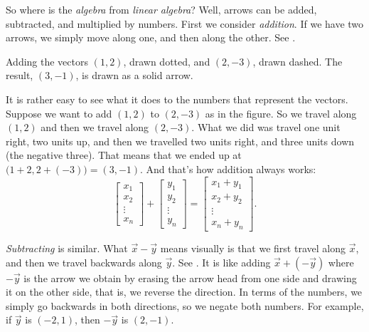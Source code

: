 So where is the \emph{algebra} from \emph{linear algebra}?
Well, arrows can be added, subtracted,
and multiplied by numbers.
First we consider \emph{addition}.
If we have two arrows, we simply
move along one, and then along the other.  See
.

\begin{myfig}
\capstart
{}
\caption{Adding the vectors $(1,2)$, drawn dotted, and $(2,-3)$, drawn dashed.  The
result, $(3,-1)$, is drawn as a solid arrow.\label{linalg-vecadd:fig}}
\end{myfig}

It is rather easy to see what it does to the numbers that represent the
vectors.  Suppose we want to add $(1,2)$ to $(2,-3)$ as in the figure.
So we travel along $(1,2)$
and then we travel along $(2,-3)$.
What we did was travel one unit right, two units up, and then
we travelled two units right, and three units down (the negative three).  That
means that we ended up at $\bigl(1+2,2+(-3)\bigr) = (3,-1)$.
And that's how addition always works:
\begin{equation*}
\begin{bmatrix}
x_{1} \\ x_2 \\ \vdots \\ x_n
\end{bmatrix} +
\begin{bmatrix}
y_{1} \\ y_2 \\ \vdots \\ y_n
\end{bmatrix} =
\begin{bmatrix}
x_1 + y_{1} \\ x_2+ y_2 \\ \vdots \\ x_n + y_n
\end{bmatrix} .
\end{equation*}

\emph{Subtracting} is similar.
What $\vec{x}- \vec{y}$ means visually is that
we first travel along $\vec{x}$, and then we travel
backwards along $\vec{y}$.
See .
It is like adding
$\vec{x}+ (- \vec{y})$ where $-\vec{y}$
is the arrow we obtain by erasing the arrow head
from one side and drawing it on the other side, that is, we reverse the
direction.  In terms of the numbers, we simply go backwards in both directions,
so we negate both numbers.  For example, if $\vec{y}$ is $(-2,1)$,
then $-\vec{y}$ is $(2,-1)$.

